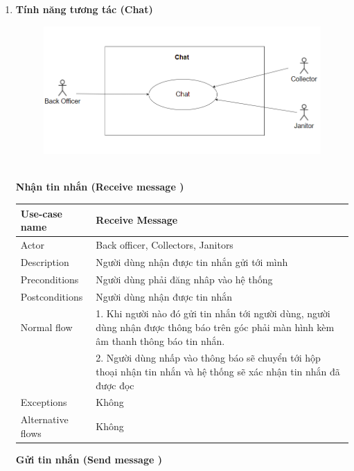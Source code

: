 \documentclass[a4paper]{article}
\begin{document}
\begin{enumerate}
\item \textbf{Tính năng tương tác (Chat)} \\
\begin{figure}[!h]
    \begin{center}
      \includegraphics[width=6in]{Image/Chat.png}
    \end{center}
\end{figure}
\\
\textbf{Nhận tin nhắn (Receive message )} \\
\begin{tabular}{|p{3cm}|p{10cm}|}
     \hline
     
     Use-case name & Receive Message \\
     \hline
     Actor & Back officer, Collectors, Janitors\\
     \hline
     Description & Người dùng nhận được tin nhắn gửi tới mình \\
     \hline
     Preconditions & Người dùng phải đăng nhâp vào hệ thống\\
          \hline
     Postconditions & Người dùng nhận được tin nhắn \\
     \hline
     Normal flow & 1. Khi người nào đó gửi tin nhắn tới người dùng, người dùng nhận được thông báo trên góc phải màn hình kèm âm thanh thông báo tin nhắn. \\
     & 2. Người dùng nhấp vào thông báo sẽ chuyển tới hộp thoại nhận tin nhắn và hệ thống sẽ xác nhận tin nhắn đã được đọc \\
     \hline
     Exceptions & Không\\
     \hline
     Alternative flows & Không\\
     \hline
\end{tabular}
\vspace{0.5cm}

\textbf{Gửi tin nhắn (Send message )} \\
\begin{tabular}{|p{3cm}|p{10cm}|}
     \hline
     

\end{tabular}
\end{enumerate}
\end{document}
